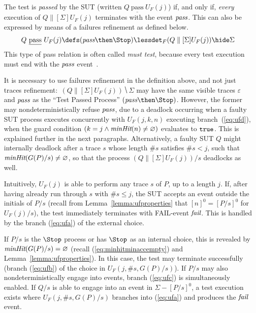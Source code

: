 \documentclass[3p,times]{elsarticle}
\newcommand{\ist}{\mbox{{\tt true}}}
\newcommand{\epass}{{\text{\it pass}}}
\newcommand{\efail}{{\text{\it fail}}}
\newcommand{\pass}{\underline{\text{pass}}}
\newcommand{\minhits}{\text{\it minHit}}
\begin{document}
The test is \emph{passed} by the SUT (written $Q\ \pass\ U_F(j)$) if, and
only if, {\it every} execution of $Q\parallel[\Sigma] U_F(j)$ terminates with
the event $\epass$. This can also be  expressed by means of a failures
refinement as defined below.
%
\begin{equation}
\label{eq:passF}
Q\ \pass\ U_F(j) \defs (\epass\then\Stop) \lessdet_F (Q\parallel[\Sigma] U_F(j)) \hide \Sigma
\end{equation}
%
This type of pass relation is often called \emph{must test}, because every
test execution must end with the $\epass$
event~\cite{Hennessy:1988:ATP:50497}.

It is necessary to use failures refinement in the definition above, and not
just traces refinement:~$(Q\parallel[\Sigma] U_F(j)) \hide \Sigma$ may have
the same visible traces $\varepsilon$ and $\epass$ as the ``Test Passed
Process'' $(\epass\then\Stop)$. However, the former may nondeterministically
refuse $\epass$, due to a deadlock occurring when a faulty SUT process
executes concurrently with $U_F(j,k,n)$ executing branch~(\ref{eq:ufd}), when
the guard condition $(k = j\wedge \minhits(n)\neq\varnothing)$ evaluates to
$\ist$. This is explained further in the next paragraphs. Alternatively, a
faulty SUT $Q$ might internally deadlock after a trace $s$ whose length $\#s$
satisfies  $\#s < j$, such that
  $\minhits(G(P)/s) \neq \varnothing$, so that the process
$(Q\parallel[\Sigma] U_F(j))/s$ deadlocks as well.

Intuitively, $U_F(j)$ is able to perform any trace $s$ of $P$, up to a length
$j$. If, after having already run through $s$ with $\#s \le j$, the SUT
accepts an event outside the initials of $P/s$
 (recall from Lemma~\ref{lemma:ufproperties} that $[n]^0 = [P/s]^0$ for $U_F(j)/s$),
the test immediately terminates with FAIL-event $\efail$. This is handled by
the branch (\ref{eq:ufa}) of the external choice. %

If $P/s$ is the $\Stop$ process or has $\Stop$ as an internal choice, this is
revealed by $\minhits(G(P)/s) = \varnothing$ (recall
(\ref{eq:minhitminaccempty}) and Lemma~\ref{lemma:ufproperties}). In this
case, the test may terminate successfully (branch (\ref{eq:ufb}) of the
choice in $U_F(j,\#s,G(P)/s)$). If $P/s$ may also nondeterministically engage
into events, branch (\ref{eq:ufc}) is simultaneously enabled. If $Q/s$ is
able to engage into an event in $\Sigma - [P/s]^0$, a test execution exists
where $U_F(j,\#s,G(P)/s)$ branches into (\ref{eq:ufa}) and produces the
$\efail$ event.
\end{document}

